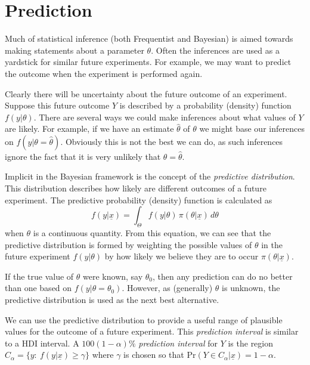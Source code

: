 \section{Prediction}
Much of statistical inference (both Frequentist and Bayesian) is aimed towards making statements about a parameter $\theta$. Often the inferences are used as a yardstick for similar future experiments. For example, we may want to predict the outcome when the experiment is performed again.

Clearly there will be uncertainty about the future outcome of an experiment. Suppose this future outcome $Y$ is described by a probability (density) function $f(y|\theta)$. There are several ways we could make inferences about what values of $Y$ are likely. For example, if we have an estimate $\hat{\theta}$ of $\theta$ we might base our inferences on $f(y|\theta=\hat{\theta})$. Obviously this is not the best we can do, as such inferences ignore the fact that it is very unlikely that $\theta=\hat{\theta}$. 

Implicit in the Bayesian framework is the concept of the {\it predictive distribution}. This distribution describes how likely are different outcomes of a future experiment. The predictive probability (density) function is calculated as
\begin{equation*}
f(y|\underline{x})=\int_\Theta
f(y|\theta)\,\pi(\theta|\underline{x})\,d\theta
\end{equation*}
when $\theta$ is a continuous quantity. From this equation, we can see that the predictive distribution is formed by weighting the possible values of $\theta$ in the future experiment $f(y|\theta)$ by how likely we believe they are to occur $\pi(\theta|\underline{x})$.

If the true value of $\theta$ were known, say $\theta_0$, then any prediction can do no better than one based on $f(y|\theta=\theta_0)$. However, as (generally) $\theta$ is unknown, the predictive distribution is used as the next best alternative.

We can use the predictive distribution to provide a useful range of plausible values for the outcome of a future experiment. This \emph{prediction interval} is similar to a HDI interval. A $100(1-\alpha)\%$ \emph{prediction interval} for $Y$ is the region $C_\alpha=\{y:~f(y|\underline{x})\geq\gamma\}$ where $\gamma$ is chosen so that $\text{Pr}(Y\in C_\alpha|\underline{x})=1-\alpha$.

